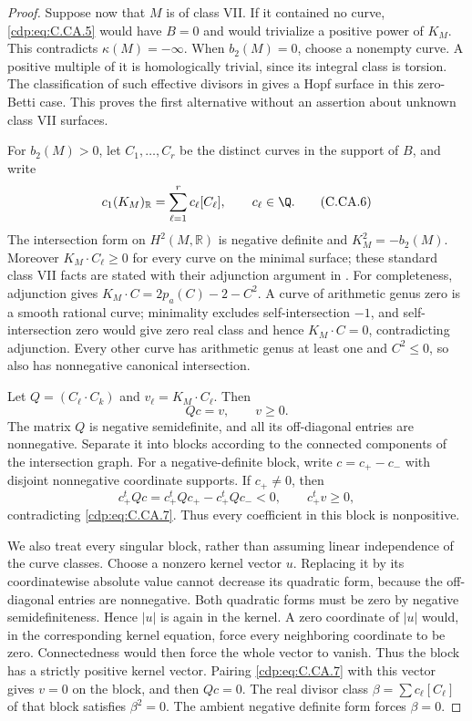 \begin{proof}
Suppose now that $M$ is of class VII. If it contained no
curve, \eqref{cdp:eq:C.CA.5} would have $B=0$ and would trivialize a
positive power of $K_M$. This contradicts
$\kappa(M)=-\infty$. When $b_2(M)=0$, choose a nonempty
curve. A positive multiple of it is homologically trivial,
since its integral class is torsion. The classification
of such effective divisors in
\cite[Remark~2.7]{DlousskyTeleman2012} gives a Hopf
surface in this zero-Betti case. This proves the first
alternative without an assertion about unknown class VII
surfaces.

For $b_2(M)>0$, let $C_1,\ldots,C_r$ be the distinct
curves in the support of $B$, and write
\[
 c_1(K_M)_{\mathbb R}=\sum_{\ell=1}^r c_\ell[C_\ell],
 \qquad c_\ell\in\Q.                                  \tag{C.CA.6}\label{cdp:eq:C.CA.6}
\]
The intersection form on $H^2(M,\mathbb R)$ is negative
definite and $K_M^2=-b_2(M)$. Moreover
$K_M\cdot C_\ell\ge0$ for every curve on the minimal
surface; these standard class VII facts are stated with
their adjunction argument in \cite[\S1, pp.~4--5]{Dloussky2006}.
For completeness, adjunction gives
$K_M\cdot C=2p_a(C)-2-C^2$. A curve of arithmetic genus
zero is a smooth rational curve; minimality excludes
self-intersection $-1$, and self-intersection zero would
give zero real class and hence $K_M\cdot C=0$, contradicting
adjunction. Every other curve has arithmetic genus at
least one and $C^2\le0$, so also has nonnegative canonical
intersection.

Let $Q=(C_\ell\cdot C_k)$ and
$v_\ell=K_M\cdot C_\ell$. Then
\[
                         Qc=v,\qquad v\ge0.             \tag{C.CA.7}\label{cdp:eq:C.CA.7}
\]
The matrix $Q$ is negative semidefinite, and all its
off-diagonal entries are nonnegative. Separate it into
blocks according to the connected components of the
intersection graph. For a negative-definite block, write
$c=c_+-c_-$ with disjoint nonnegative coordinate supports.
If $c_+\ne0$, then
\[
 c_+^tQc=c_+^tQc_+-c_+^tQc_-<0,
 \qquad c_+^tv\ge0,                                    \tag{C.CA.8}\label{cdp:eq:C.CA.8}
\]
contradicting \eqref{cdp:eq:C.CA.7}. Thus every coefficient in this
block is nonpositive.

We also treat every singular block, rather than assuming
linear independence of the curve classes. Choose a nonzero
kernel vector $u$. Replacing it by its coordinatewise
absolute value cannot decrease its quadratic form, because
the off-diagonal entries are nonnegative. Both quadratic
forms must be zero by negative semidefiniteness. Hence
$|u|$ is again in the kernel. A zero coordinate of $|u|$
would, in the corresponding kernel equation, force every
neighboring coordinate to be zero. Connectedness would
then force the whole vector to vanish. Thus the block has
a strictly positive kernel vector. Pairing \eqref{cdp:eq:C.CA.7} with
this vector gives $v=0$ on the block, and then $Qc=0$.
The real divisor class $\beta=\sum c_\ell[C_\ell]$ of
that block satisfies $\beta^2=0$. The ambient negative
definite form forces $\beta=0$.


\end{proof}
